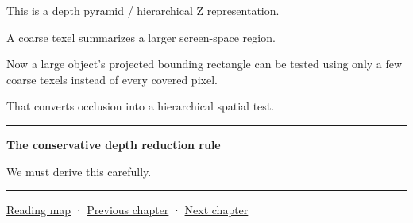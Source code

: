 This is a depth pyramid / hierarchical Z representation.

A coarse texel summarizes a larger screen-space region.

Now a large object's projected bounding rectangle can be tested using only a few coarse texels instead of every covered pixel.

That converts occlusion into a hierarchical spatial test.

\begin{center}\rule{0.5\linewidth}{0.5pt}\end{center}

\textbf{The conservative depth reduction rule}

We must derive this carefully.

\begin{center}\rule{0.5\linewidth}{0.5pt}\end{center}

\href{Chapter\%20Edition/03\%20-\%20Game\%20Engine/00\%20-\%20Reading\%20Map}{Reading map} · \hyperref[06-engine-ii-ch028]{Previous chapter} · \hyperref[06-engine-ii-ch030]{Next chapter}
